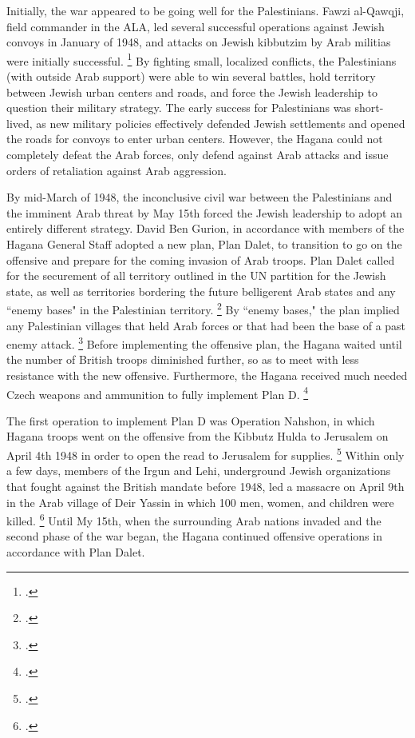 \documentclass{turabian-researchpaper}
\begin{document}
Initially, the war appeared to be going well for the Palestinians.  Fawzi al-Qawqji, field commander in the ALA, led several successful operations against Jewish convoys in January of 1948, and attacks on Jewish kibbutzim by Arab militias were initially successful.
\footcite[][79]{pappe}
By fighting small, localized conflicts, the Palestinians (with outside Arab support) were able to win several battles, hold territory between Jewish urban centers and roads, and force the Jewish leadership to question their military strategy.  The early success for Palestinians was short-lived, as new military policies effectively defended Jewish settlements and opened the roads for convoys to enter urban centers.  However, the Hagana could not completely defeat the Arab forces, only defend against Arab attacks and issue orders of retaliation against Arab aggression.

By mid-March of 1948, the inconclusive civil war between the Palestinians and the imminent Arab threat by May 15th forced the Jewish leadership to adopt an entirely different strategy.  David Ben Gurion, in accordance with members of the Hagana General Staff adopted a new plan, Plan Dalet, to transition to go on the offensive and prepare for the coming invasion of Arab troops.  Plan Dalet called for the securement of all territory outlined in the UN partition for the Jewish state, as well as territories bordering the future belligerent Arab states and any ``enemy bases" in the Palestinian territory.
\footcite{khalidi}
By ``enemy bases," the plan implied any Palestinian villages that held Arab forces or that had been the base of a past enemy attack.
\footcite[][119]{morris}
Before implementing the offensive plan, the Hagana waited until the number of British troops diminished further, so as to meet with less resistance with the new offensive.  Furthermore, the Hagana received much needed Czech weapons and ammunition to fully implement Plan D.
\footcite[][116]{morris}

The first operation to implement Plan D was Operation Nahshon, in which Hagana troops went on the offensive from the Kibbutz Hulda to Jerusalem on April 4th 1948 in order to open the read to Jerusalem for supplies.
\footcite[][121]{morris}
Within only a few days, members of the Irgun and Lehi, underground Jewish organizations that fought against the British mandate before 1948, led a massacre on April 9th in the Arab village of Deir Yassin in which 100 men, women, and children were killed.
\footcite{nabka}
Until My 15th, when the surrounding Arab nations invaded and the second phase of the war began, the Hagana continued offensive operations in accordance with Plan Dalet.
\end{document}
